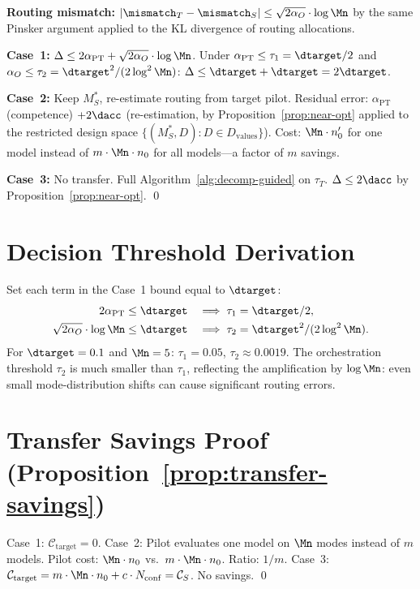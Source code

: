 \textbf{Routing mismatch:}
$|\mismatch_T - \mismatch_S| \le \sqrt{2\alpha_O} \cdot \log\Mn$
by the same Pinsker argument applied to the KL divergence of routing
allocations.

\textbf{Case~1:}
$\Delta \le 2\alpha_{\mathrm{PT}} + \sqrt{2\alpha_O}\cdot\log\Mn$.
Under $\alpha_{\mathrm{PT}} \le \tau_1 = \dtarget/2$ and
$\alpha_O \le \tau_2 = \dtarget^2/(2\log^2\Mn)$:
$\Delta \le \dtarget + \dtarget = 2\dtarget$.

\textbf{Case~2:}
Keep $M_S^*$, re-estimate routing from target pilot.
Residual error: $\alpha_{\mathrm{PT}}$ (competence) $+ 2\dacc$
(re-estimation, by Proposition~\ref{prop:near-opt} applied to the
restricted design space $\{(M_S^*, D) : D \in D_{\mathrm{values}}\}$).
Cost: $\Mn \cdot n_0'$ for one model instead of $m \cdot \Mn \cdot n_0$
for all models---a factor of $m$ savings.

\textbf{Case~3:}
No transfer. Full Algorithm~\ref{alg:decomp-guided} on $\tau_T$.
$\Delta \le 2\dacc$ by Proposition~\ref{prop:near-opt}. \qed

\section{Decision Threshold Derivation}
\label{app:thresholds}

Set each term in the Case~1 bound equal to $\dtarget$:
\begin{align}
  2\alpha_{\mathrm{PT}} &\le \dtarget
    &\implies \tau_1 &= \dtarget/2, \\
  \sqrt{2\alpha_O}\cdot\log\Mn &\le \dtarget
    &\implies \tau_2 &= \dtarget^2/(2\log^2\Mn).
\end{align}
For $\dtarget = 0.1$ and $\Mn = 5$:
$\tau_1 = 0.05$, $\tau_2 \approx 0.0019$.
The orchestration threshold $\tau_2$ is much smaller than $\tau_1$,
reflecting the amplification by $\log\Mn$: even small mode-distribution
shifts can cause significant routing errors.

\section{Transfer Savings Proof (Proposition~\ref{prop:transfer-savings})}
\label{app:transfer-savings}

Case~1: $\mathcal{C}_{\mathrm{target}} = 0$.
Case~2: Pilot evaluates one model on $\Mn$ modes instead of $m$ models.
Pilot cost: $\Mn \cdot n_0$ vs.\ $m \cdot \Mn \cdot n_0$.
Ratio: $1/m$.
Case~3: $\mathcal{C}_{\mathrm{target}} = m \cdot \Mn \cdot n_0 +
c \cdot N_{\mathrm{conf}} = \mathcal{C}_S$. No savings. \qed

